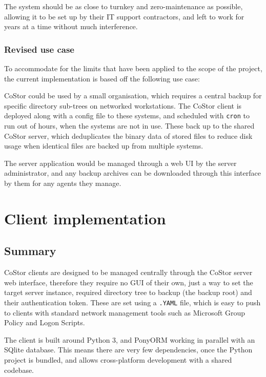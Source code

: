 \documentclass[bsc,frontabs,twoside,singlespacing,parskip,deptreport]{infthesis}     %
\begin{document}
The system should be as close to turnkey and zero-maintenance as possible, allowing it to be
set up by their IT support contractors, and left to work for years at a time without much
interference.

\subsection{Revised use case}

To accommodate for the limits that have been applied to the scope of the project, the current
implementation is based off the following use case:

CoStor could be used by a small organisation, which requires a central backup for specific
directory sub-trees on networked workstations. The CoStor client is deployed along with a
config file to these systems, and scheduled with \texttt{cron} to run out of hours, when the
systems are not in use. These back up to the shared CoStor server, which deduplicates the
binary data of stored files to reduce disk usage when identical files are backed up from
multiple systems.

The server application would be managed through a web UI by the server administrator, and any
backup archives can be downloaded through this interface by them for any agents they manage.

\chapter{Client implementation}

\section{Summary}

CoStor clients are designed to be managed centrally through the CoStor server web interface,
therefore they require no GUI of their own, just a way to set the target server instance, 
required directory tree to backup (the backup root) and their authentication token. These are
set using a \texttt{.YAML} file, which is easy to push to clients with standard network 
management tools such as Microsoft Group Policy and Logon Scripts.

The client is built around Python 3, and PonyORM working in parallel with an SQlite database. 
This means there are very few dependencies, once the Python project is bundled, and allows
cross-platform development with a shared codebase.
\end{document}
